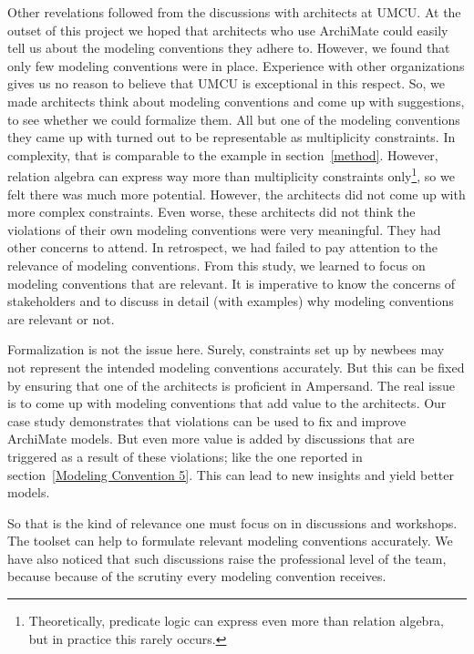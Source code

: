 \documentclass[sn-vancouver]{sn-jnl}%
\theoremstyle{thmstyleone}%
\theoremstyle{thmstyletwo}%
\theoremstyle{thmstylethree}%
\begin{document}
Other revelations followed from the discussions with architects at UMCU.
At the outset of this project we hoped that architects who use ArchiMate could easily tell us about the modeling conventions they adhere to.
However, we found that only few modeling conventions were in place.
Experience with other organizations gives us no reason to believe that UMCU is exceptional in this respect.
So, we made architects think about modeling conventions and come up with suggestions,
to see whether we could formalize them.
All but one of the modeling conventions they came up with turned out to be representable as multiplicity constraints.
In complexity, that is comparable to the example in section~\ref{method}.
However, relation algebra can express way more than multiplicity constraints only\footnote{Theoretically, predicate logic can express even more than relation algebra, but in practice this rarely occurs.}, so we felt there was much more potential.
However, the architects did not come up with more complex constraints.
Even worse, these architects did not think the violations of their own modeling conventions were very meaningful.
They had other concerns to attend.
In retrospect, we had failed to pay attention to the relevance of modeling conventions.
From this study, we learned to focus on modeling conventions that are relevant.
It is imperative to know the concerns of stakeholders and to discuss in detail (with examples) why modeling conventions are relevant or not.

Formalization is not the issue here.
Surely, constraints set up by newbees may not represent the intended modeling conventions accurately.
But this can be fixed by ensuring that one of the architects is proficient in Ampersand.
The real issue is to come up with modeling conventions that add value to the architects.
Our case study demonstrates that violations can be used to fix and improve ArchiMate models.
But even more value is added by discussions that are triggered as a result of these violations;
like the one reported in section~\ref{Modeling Convention 5}.
This can lead to new insights and yield better models.

So that is the kind of relevance one must focus on in discussions and workshops.
The toolset can help to formulate relevant modeling conventions accurately.
We have also noticed that such discussions raise the professional level of the team,
because because of the scrutiny every modeling convention receives.
\end{document}

